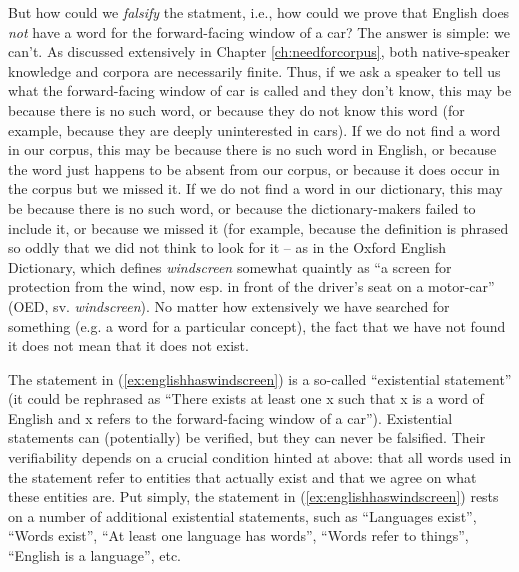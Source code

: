 But how could we \emph{falsify} the statment, i.e., how could we prove that English does \emph{not} have a word for the forward-facing window of a car? The answer is simple: we can't. As discussed extensively in Chapter \ref{ch:needforcorpus}, both native-speaker knowledge and corpora are necessarily finite. Thus, if we ask a speaker to tell us what the forward-facing window of car is called and they don't know, this may be because there is no such word, or because they do not know this word (for example, because they are deeply uninterested in cars). If we do not find a word in our corpus, this may be because there is no such word in English, or because the word just happens to be absent from our corpus, or because it does occur in the corpus but we missed it. If we do not find a word in our dictionary, this may be because there is no such word, or because the dictionary-makers failed to include it, or because we missed it (for example, because the definition is phrased so oddly that we did not think to look for it -- as in the Oxford English Dictionary, which defines \textit{windscreen} somewhat quaintly as ``a screen for protection from the wind, now esp. in front of the driver's seat on a motor-car'' (OED, sv. \textit{windscreen}). No matter how extensively we have searched for something (e.g. a word for a particular concept), the fact that we have not found it does not mean that it does not exist.


The statement in (\ref{ex:englishhaswindscreen}) is a so-called ``existential statement'' (it could be rephrased as ``There exists at least one x such that x is a word of English and x refers to the forward-facing window of a car''). Existential statements can (potentially) be verified, but they can never be falsified. Their verifiability depends on a crucial condition hinted at above: that all words used in the statement refer to entities that actually exist and that we agree on what these entities are. Put simply, the statement in (\ref{ex:englishhaswindscreen}) rests on a number of additional existential statements, such as ``Languages exist'', ``Words exist'', ``At least one language has words'', ``Words refer to things'', ``English is a language'', etc. 

